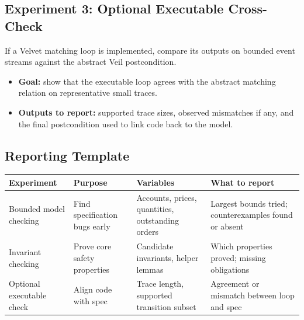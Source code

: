 \subsection{Experiment 3: Optional Executable Cross-Check}

If a Velvet matching loop is implemented, compare its outputs on bounded event
streams against the abstract Veil postcondition.

\begin{itemize}[leftmargin=1.5em]
\item \textbf{Goal:} show that the executable loop agrees with the abstract
matching relation on representative small traces.
\item \textbf{Outputs to report:} supported trace sizes, observed mismatches if
any, and the final postcondition used to link code back to the model.
\end{itemize}

\subsection{Reporting Template}

\begin{center}
\begin{tabular}{@{}>{\raggedright}p{3.6cm} p{4.2cm} p{3.0cm} p{4.0cm}@{}}
\textbf{Experiment} & \textbf{Purpose} & \textbf{Variables} & \textbf{What to report} \\
\hline
Bounded model checking & Find specification bugs early & Accounts, prices, quantities, outstanding orders & Largest bounds tried; counterexamples found or absent \\
Invariant checking & Prove core safety properties & Candidate invariants, helper lemmas & Which properties proved; missing obligations \\
Optional executable check & Align code with spec & Trace length, supported transition subset & Agreement or mismatch between loop and spec \\
\end{tabular}
\end{center}
